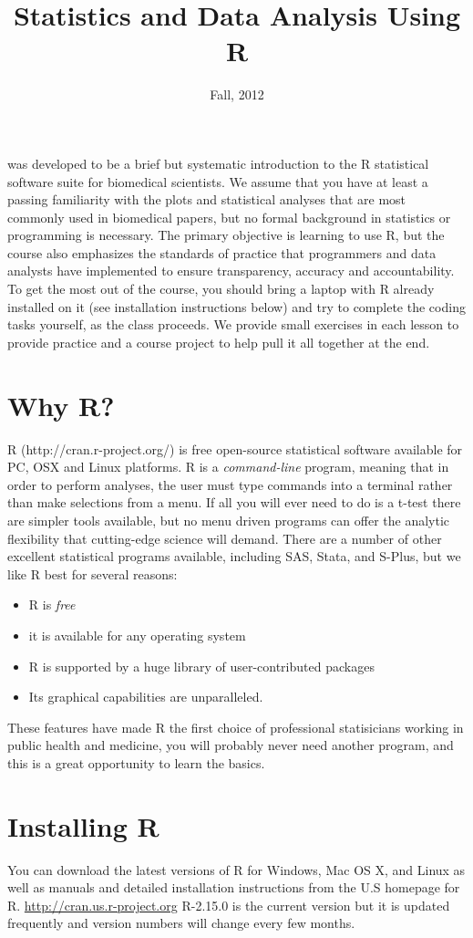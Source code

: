 \documentclass{article}
\title{Statistics and Data Analysis Using R}
\date{Fall, 2012}
\begin{document}
\maketitle
{} was developed to be a brief but systematic introduction to the R statistical software suite for biomedical scientists.  We assume that you have at least a passing familiarity with the plots and statistical analyses that are most commonly used in biomedical papers, but no formal background in statistics or programming is necessary.  The primary objective is learning to use R, but the course also emphasizes the standards of practice that programmers and data analysts have implemented to ensure transparency, accuracy and accountability.  To get the most out of the course, you should bring a laptop with R already installed on it (see installation instructions below) and try to complete the coding tasks yourself, as the class proceeds.  We provide small exercises in each lesson to provide practice and a course project to help pull it all together at the end.   

\section*{Why R?}
R (http://cran.r-project.org/) is free open-source statistical
software available for PC, OSX and Linux platforms. 
 R is a {\it command-line} program, meaning that in order to perform
 analyses, 
the user must type commands into a terminal rather than make
selections from a menu.  If all you will ever need to do is a t-test there are simpler tools available, but no menu driven programs can offer the analytic flexibility that cutting-edge science will demand.  There are a number of other excellent statistical programs available, including SAS, Stata, and S-Plus, but we like R best for several reasons:
\begin{itemize}
\item R is {\it free}
\item it is available for any operating system
\item R is supported by a huge library of user-contributed packages 
\item Its graphical capabilities are unparalleled. 
\end{itemize}  
These features have made R the first choice of professional
statisicians working 
in public health and medicine, you will probably never need another
program, 
and this is a great opportunity to learn the basics.
\section*{Installing R}
You can download the latest versions of R for Windows,  Mac OS X, and Linux as well as manuals and detailed installation instructions from the U.S homepage for R.  
\url{http://cran.us.r-project.org}
R-2.15.0 is the current version but it is updated frequently and version numbers will change every few months.   
\end{document}
